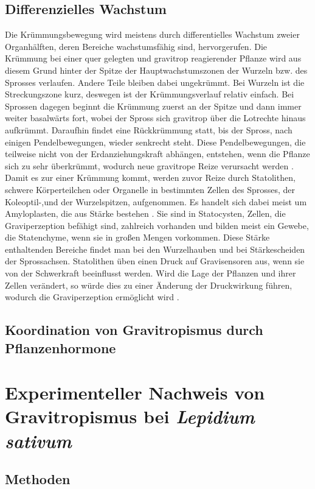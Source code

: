 \documentclass[
a4paper, 
11pt, 
ngerman,
listof=totoc,
bibliography=totocnumbered,
abstracton
]{scrreprt}
\begin{document}
\section{Differenzielles Wachstum}
Die Krümmungsbewegung wird meistens durch differentielles Wachstum zweier Organhälften, deren Bereiche wachstumsfähig sind, hervorgerufen. Die Krümmung bei einer quer gelegten und gravitrop reagierender Pflanze wird aus diesem Grund hinter der Spitze der Hauptwachstumszonen der Wurzeln bzw. des Sprosses verlaufen. Andere Teile bleiben dabei ungekrümmt.
Bei Wurzeln ist die Streckungszone kurz, deswegen ist der Krümmungsverlauf relativ einfach. Bei Sprossen dagegen beginnt die Krümmung zuerst an der Spitze und dann immer weiter basalwärts fort, wobei der Spross sich gravitrop über die Lotrechte hinaus aufkrümmt. Daraufhin findet eine Rückkrümmung statt, bis der Spross, nach einigen Pendelbewegungen, wieder senkrecht steht. Diese Pendelbewegungen, die teilweise nicht von der Erdanziehungskraft abhängen, entstehen, wenn die Pflanze sich zu sehr überkrümmt, wodurch neue gravitrope Reize verursacht werden \parencite[450f]{Strasburger}.
Damit es zur einer Krümmung kommt, werden zuvor Reize durch Statolithen, schwere Körperteilchen oder Organelle in bestimmten Zellen des Sprosses, der Koleoptil-,und der Wurzelspitzen, aufgenommen. Es handelt sich dabei meist um Amyloplasten, die aus Stärke bestehen \parencite[530]{Luettge}.
Sie sind in Statocysten, Zellen, die Graviperzeption befähigt sind, zahlreich vorhanden und bilden meist ein Gewebe, die Statenchyme, wenn sie in großen Mengen vorkommen. Diese Stärke enthaltenden Bereiche findet man bei den Wurzelhauben und bei Stärkescheiden der Sprossachsen.  
Statolithen üben einen Druck auf Gravisensoren aus, wenn sie von der Schwerkraft beeinflusst werden. Wird die Lage der Pflanzen und ihrer Zellen verändert, so würde dies zu einer Änderung der Druckwirkung führen, wodurch die Graviperzeption ermöglicht wird \parencite[501f]{Nultsch}.


\section{Koordination von Gravitropismus durch Pflanzenhormone}

\chapter{Experimenteller Nachweis von Gravitropismus bei \emph{Lepidium sativum}}

\section{Methoden}
\end{document}
